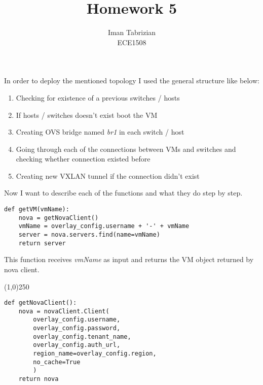 \documentclass[12pt]{article}
\begin{document}
 
 
\title{Homework 5}
\author{Iman Tabrizian\\ %
ECE1508}

\maketitle

In order to deploy the mentioned topology I used the general structure like below: 

\begin{enumerate}
	\item Checking for existence of a previous switches / hosts
	\item If hosts / switches doesn't exist boot the VM 
	\item Creating OVS bridge named \textit{br1} in each switch / host
	\item Going through each of the connections between VMs and switches and checking whether connection existed before
	\item Creating new VXLAN tunnel if the connection didn't exist
\end{enumerate}


Now I want to describe each of the functions and what they do step by step. \\

\begin{verbatim}
def getVM(vmName):
    nova = getNovaClient()
    vmName = overlay_config.username + '-' + vmName
    server = nova.servers.find(name=vmName)
    return server
\end{verbatim}

This function receives \textit{vmName} as input and returns the VM object returned by nova client. \\
\begin{center}
	\line(1,0){250}
\end{center}

\begin{verbatim}
def getNovaClient():
    nova = novaClient.Client(
        overlay_config.username,
        overlay_config.password,
        overlay_config.tenant_name,
        overlay_config.auth_url,
        region_name=overlay_config.region,
        no_cache=True
        )
    return nova
\end{verbatim}
\end{document}

